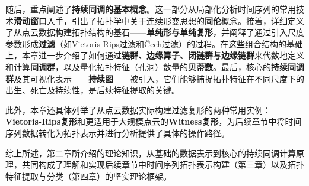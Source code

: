 随后，重点阐述了\textbf{持续同调的基本概念}。这一部分从局部化分析时间序列的常用技术\textbf{滑动窗口}入手，引出了拓扑学中关于连续形变思想的\textbf{同伦}概念。接着，详细定义了从点云数据构建拓扑结构的基石——\textbf{单纯形与单纯复形}，并阐释了通过引入尺度参数形成\textbf{过滤}（如Vietoris-Rips过滤和Čech过滤）的过程。在这些组合结构的基础上，本章进一步介绍了如何通过\textbf{链群、边缘算子、闭链群与边缘链群}来代数地定义和计算\textbf{同调群}，以及量化拓扑特征（孔洞）数量的\textbf{贝蒂数}。最后，核心的\textbf{持续同调群}及其可视化表示——\textbf{持续图}——被引入，它们能够捕捉拓扑特征在不同尺度下的出生、死亡及持续性，是后续特征提取的关键。

此外，本章还具体列举了从点云数据实际构建过滤复形的两种常用实例：\textbf{Vietoris-Rips复形}和更适用于大规模点云的\textbf{Witness复形}，为后续章节中将时间序列数据转化为拓扑表示并进行分析提供了具体的操作路径。

综上所述，第二章所介绍的理论知识，从基础的数据表示到核心的持续同调计算原理，共同构成了理解和实现后续章节中时间序列拓扑表示构建（第三章）以及拓扑特征提取与分类（第四章）的坚实理论框架。